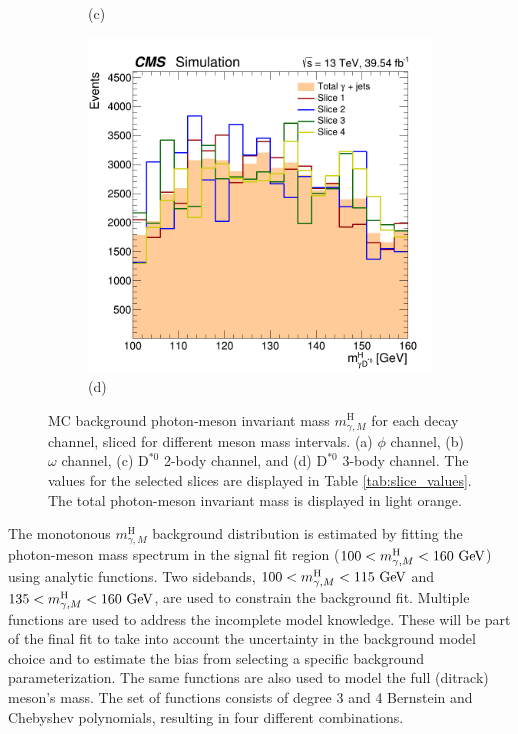 \begin{figure}[!ht]
\begin{subfigure}[t]{0.50\mylength}
        \vspace*{-0.2cm}
        \caption{\footnotesize (c)}
    \end{subfigure}%
    \begin{subfigure}[t]{0.50\mylength}
        \centering
        \includegraphics[width=0.49\mylength]{resources/plots/D0Star_3body_fit_BKG_MH_sliced.png}
        \vspace*{-0.2cm}
        \caption{\footnotesize (d)}
    \end{subfigure}%
\caption{MC background photon-meson invariant mass $m^{\text{H}}_{\gamma, M}$ for each decay channel, sliced for different meson mass intervals. (a) $\phi$ channel, (b) $\omega$ channel, (c) $\text{D}^{*0}$ 2-body channel, and (d) $\text{D}^{*0}$ 3-body channel. The values for the selected slices are displayed in Table \ref{tab:slice_values}. The total photon-meson invariant mass is displayed in light orange.}
\label{fig:bkg_modelling_sliced}
    \vspace*{-0.0cm}
\end{figure}

\newpage
The monotonous $m^{\text{H}}_{\gamma, M}$ background distribution is estimated by fitting the photon-meson mass spectrum in the signal fit region ($100 < m^{\text{H}}_{\gamma, M} < 160\ \text{GeV}$) using analytic functions. Two sidebands, $100 < m^{\text{H}}_{\gamma, M} < 115\ \text{GeV}$ and $135 < m^{\text{H}}_{\gamma, M} < 160\ \GeV$, are used to constrain the background fit. Multiple functions are used to address the incomplete model knowledge. These will be part of the final fit to take into account the uncertainty in the background model choice and to estimate the bias from selecting a specific background parameterization. The same functions are also used to model the full (ditrack) meson's mass. The set of functions consists of degree 3 and 4 Bernstein and Chebyshev polynomials, resulting in four different combinations.

